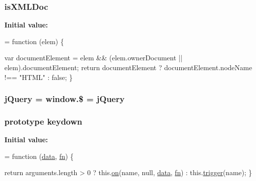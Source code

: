\subsubsection[{\texorpdfstring{is\+X\+M\+L\+Doc}{isXMLDoc}}]{ is\+X\+M\+L\+Doc}\hypertarget{jquery-2_82_81-vsdoc_8js_acf4730466ce2c301378ee112fdba9139}{}\label{jquery-2_82_81-vsdoc_8js_acf4730466ce2c301378ee112fdba9139}
{\bfseries Initial value\+:}
\begin{DoxyCode}
= \textcolor{keyword}{function} (elem) \{
        

        
        
        var documentElement = elem && (elem.ownerDocument || elem).documentElement;
        \textcolor{keywordflow}{return} documentElement ? documentElement.nodeName !== \textcolor{stringliteral}{"HTML"} : \textcolor{keyword}{false};
    \}
\end{DoxyCode}
\subsubsection[{\texorpdfstring{j\+Query}{jQuery}}]{ j\+Query = window.\$ = j\+Query}\hypertarget{jquery-2_82_81-vsdoc_8js_add5237586d970a38a81f990e8eb28c6c}{}\label{jquery-2_82_81-vsdoc_8js_add5237586d970a38a81f990e8eb28c6c}
\subsubsection[{\texorpdfstring{keydown}{keydown}}]{ {\bf prototype} keydown}\hypertarget{jquery-2_82_81-vsdoc_8js_af982393c1b8eb2a9ba4c7337f625ad89}{}\label{jquery-2_82_81-vsdoc_8js_af982393c1b8eb2a9ba4c7337f625ad89}
{\bfseries Initial value\+:}
\begin{DoxyCode}
= \textcolor{keyword}{function} (\hyperlink{jquery-2_82_81-vsdoc_8js_a609407b3456fdc3c5671a9fc4a226ff7}{data}, \hyperlink{jquery-2_82_81-vsdoc_8js_acef6bdaf6b9b20fdcca1ea86f0902c3b}{fn}) \{
        

        \textcolor{keywordflow}{return} arguments.length > 0 ?
            this.\hyperlink{jquery-2_82_81-vsdoc_8js_ae453b412b883f60220d73468ef6c6dbc}{on}(name, null, \hyperlink{jquery-2_82_81-vsdoc_8js_a609407b3456fdc3c5671a9fc4a226ff7}{data}, \hyperlink{jquery-2_82_81-vsdoc_8js_acef6bdaf6b9b20fdcca1ea86f0902c3b}{fn}) :
            this.\hyperlink{jquery-2_82_81-vsdoc_8js_a2388c4114d5e3e4eab020f973641519c}{trigger}(name);
    \}
\end{DoxyCode}
